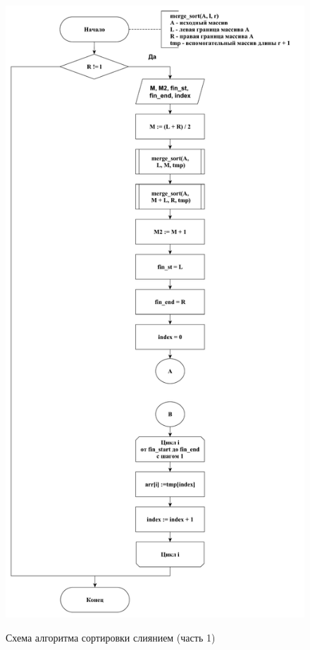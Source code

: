 \documentclass[a4paper,12pt]{article}
\begin{document}
	    \begin{figure}[h!]
	    	\begin{center}
	    		{\includegraphics[scale = 0.38]{schema04.pdf}}
	    		\caption{Схема алгоритма сортировки слиянием (часть 1)}
	    		\label{fig:schema_merge_sort_1}
	    	\end{center}
	    \end{figure}
	    
\end{document}

